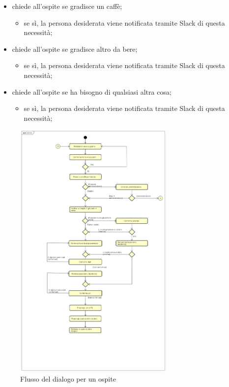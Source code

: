 \begin{itemize}
\begin{itemize}
\begin{itemize}
		\end{itemize}
	\end{itemize}
	\item \PROGETTO{} chiede all'ospite se gradisce un caffè;
	\begin{itemize}
		\item se sì, la persona desiderata viene notificata tramite Slack di questa necessità;
	\end{itemize}
	\item \PROGETTO{} chiede all'ospite se gradisce altro da bere;
	\begin{itemize}
		\item se sì, la persona desiderata viene notificata tramite Slack di questa necessità;
	\end{itemize}
	\item \PROGETTO{} chiede all'ospite se ha bisogno di qualsiasi altra cosa;
	\begin{itemize}
		\item se sì, la persona desiderata viene notificata tramite Slack di questa necessità;
	\end{itemize}
\end{itemize}
\begin{figure}[h]
	\centerline{\includegraphics[width=0.7\textwidth,height=\textheight,keepaspectratio]{sezioni/images/Utente.png}}
	\caption{Flusso del dialogo per un ospite}\label{fig:flussoOspite}
\end{figure}
\newpage
